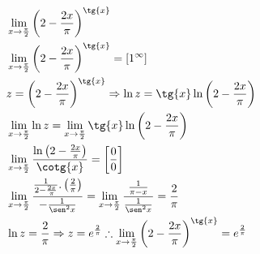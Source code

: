 \begin{ex}
\begin{align}
&\lim_{x\rightarrow \frac{\pi}{2}} \left(2-\frac{2x}{\pi}\right)^{\tg{x}}\nonumber\\
&\lim_{x\rightarrow \frac{\pi}{2}} \left(2-\frac{2x}{\pi}\right)^{\tg{x}}=[1^\infty]\nonumber\\
&z=\left(2-\frac{2x}{\pi}\right)^{\tg{x}} \Rightarrow \ln{z}=\tg{x}\ln{\left(2-\frac{2x}{\pi}\right)}\nonumber\\
&\lim_{x\rightarrow \frac{\pi}{2}} \ln{z}=\lim_{x\rightarrow \frac{\pi}{2}} \tg{x}\ln{\left(2-\frac{2x}{\pi}\right)}\nonumber\\
&\lim_{x\rightarrow \frac{\pi}{2}} \frac{\ln{\left(2-\frac{2x}{\pi}\right)}}{\cotg{x}}=\left[\frac{0}{0}\right]\nonumber\\
&\lim_{x\rightarrow \frac{\pi}{2}} \frac{\frac{1}{2-\frac{2x}{\pi}}.\left(\frac{2}{\pi}\right)}{-\frac{1}{\sen^2{x}}}=\lim_{x\rightarrow \frac{\pi}{2}} \frac{\frac{1}{\pi-x}}{\frac{1}{\sen^2{x}}}=\frac{2}{\pi}\nonumber\\
&\ln{z}=\frac{2}{\pi} \Rightarrow z=e^{\frac{2}{\pi}} \therefore \lim_{x\rightarrow \frac{\pi}{2}} \left(2-\frac{2x}{\pi}\right)^{\tg{x}}=e^{\frac{2}{\pi}}\nonumber
\end{align}
\end{ex}